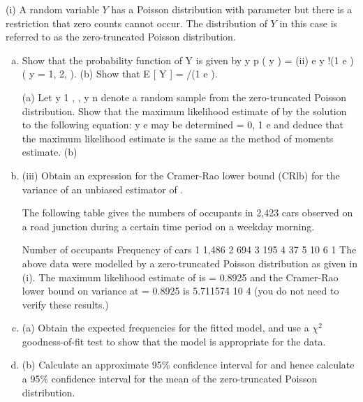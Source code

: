 \documentclass[a4paper,12pt]{article}
\begin{document}
(i)
 A random variable $Y$ has a Poisson distribution with parameter but there is a restriction that zero counts cannot occur. The distribution of $Y$ in this case is referred to as the zero-truncated Poisson distribution.
\begin{enumerate}[(a)]
\item
Show that the probability function of Y is given by
y
p ( y ) =
(ii)
e
y !(1 e )
( y = 1, 2, ).
(b) Show that E [ Y ] = /(1 e ).

(a) Let y 1 , , y n denote a random sample from the zero-truncated Poisson distribution.
Show that the maximum likelihood estimate of by the solution to the following equation:
y
e
may be determined
= 0,
1 e
and deduce that the maximum likelihood estimate is the same as the method of moments estimate.
(b)
\item (iii)
Obtain an expression for the Cramer-Rao lower bound (CRlb) for the variance of an unbiased estimator of .

The following table gives the numbers of occupants in 2,423 cars observed on a road junction during a certain time period on a weekday morning.

Number of occupants
Frequency of cars
1
1,486
2
694
3
195
4
37
5
10
6
1
The above data were modelled by a zero-truncated Poisson distribution as given in (i).
The maximum likelihood estimate of is = 0.8925 and the Cramer-Rao lower bound on variance at = 0.8925 is 5.711574 10 4 (you do not need to verify these results.)
\item (a) Obtain the expected frequencies for the fitted model, and use a $\chi^2$ goodness-of-fit test to show that the model is appropriate for the data.
\item (b) Calculate an approximate 95\% confidence interval for and hence calculate a 95\% confidence interval for the mean of the zero-truncated Poisson distribution.
\end{enumerate}
\newpage
\end{document}
